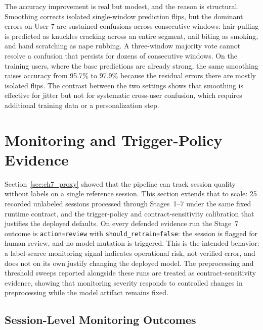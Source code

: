 The accuracy improvement is real but modest, and the reason is structural. Smoothing corrects isolated single-window prediction flips, but the dominant errors on User-7 are sustained confusions across consecutive windows: hair pulling is predicted as knuckles cracking across an entire segment, nail biting as smoking, and hand scratching as nape rubbing. A three-window majority vote cannot resolve a confusion that persists for dozens of consecutive windows. On the training users, where the base predictions are already strong, the same smoothing raises accuracy from 95.7\% to 97.9\% because the residual errors there are mostly isolated flips. The contrast between the two settings shows that smoothing is effective for jitter but not for systematic cross-user confusion, which requires additional training data or a personalization step.

\section{Monitoring and Trigger-Policy Evidence}
\label{sec:ch7_monitoring}

Section~\ref{sec:ch7_proxy} showed that the pipeline can track session quality without labels on a single reference session. This section extends that to scale: 25 recorded unlabeled sessions processed through Stages~1--7 under the same fixed runtime contract, and the trigger-policy and contract-sensitivity calibration that justifies the deployed defaults. On every defended evidence run the Stage~7 outcome is \texttt{action=review} with \texttt{should\_retrain=false}: the session is flagged for human review, and no model mutation is triggered. This is the intended behavior: a label-scarce monitoring signal indicates operational risk, not verified error, and does not on its own justify changing the deployed model. The preprocessing and threshold sweeps reported alongside these runs are treated as contract-sensitivity evidence, showing that monitoring severity responds to controlled changes in preprocessing while the model artifact remains fixed.

\subsection{Session-Level Monitoring Outcomes}
\label{sec:ch7_sessions25}

